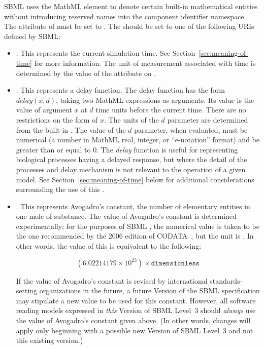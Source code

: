 SBML \thisL uses the MathML  element to denote
certain built-in mathematical entities without introducing
reserved names into the component identifier namespace.  The
 attribute of  must be set to
.  The  should be set to one of the
following URIs defined by SBML:
\begin{itemize}

\item {}.  This
  represents the current simulation time.  See
  Section~\ref{sec:meaning-of-time} for more information.  The
  unit of measurement associated with time is determined by the
  value of the  attribute on \Model.

\item {}.  This
 represents a delay function.  The delay function has the form
  $delay(x, d)$, taking two MathML expressions as arguments.  Its
  value is the value of argument $x$ at $d$ time units before the
  current time.  There are no restrictions on the form of $x$.
  The units of the $d$ parameter are determined from the built-in
  .  The value of the $d$ parameter, when evaluated,
  must be numerical (\ie a number in MathML real, integer, or
  ``e-notation'' format) and be greater than or equal to 0.  The
  \emph{delay} function is useful for representing biological
  processes having a delayed response, but where the detail of the
  processes and delay mechanism is not relevant to the operation
  of a given model.  See Section~\ref{sec:meaning-of-time} below
  for additional considerations surrounding the use of this
  .

\item {}.  This
  represents Avogadro's constant, the number of elementary
  entities in one mole of substance.  The value of Avogadro's
  constant is determined experimentally; for the purposes of SBML
  \thisLVnum, the numerical value is taken to be the one
  recommended by the 2006 edition of CODATA~\citep{codata_2008},
  but the unit is .  In other words, the
  value of this  is equivalent to the following:
  \begin{linenomath}
    \begin{equation*}
      (6.02214179 \times 10^{23}) \times \texttt{dimensionless}
    \end{equation*}
  \end{linenomath}
  If the value of Avogadro's constant is revised by international
  standards-setting organizations in the future, a future Version
  of the SBML \thisL specification may stipulate a new value to be
  used for this  constant.  However, all software
  reading models expressed in \emph{this} Version of SBML Level~3
  should \emph{always} use the value of Avogadro's constant given
  above.  (In other words, changes will apply only beginning with
  a possible new Version of SBML Level~3 and not this existing
  version.)


\end{itemize}
